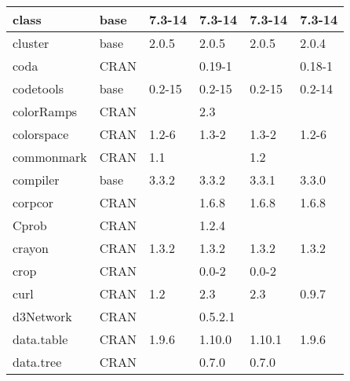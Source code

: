 \begin{longtable}{@{\extracolsep{\fill}}|l|l|l|l|l|l|@{}}
class                         & base                      & 7.3-14      & 7.3-14      & 7.3-14         & 7.3-14           \\ \hline
cluster                       & base                      & 2.0.5       & 2.0.5       & 2.0.5          & 2.0.4            \\ \hline
coda                          & CRAN                      &             & 0.19-1      &                & 0.18-1           \\ \hline
codetools                     & base                      & 0.2-15      & 0.2-15      & 0.2-15         & 0.2-14           \\ \hline
colorRamps                    & CRAN                      &             & 2.3         &                &                  \\ \hline
colorspace                    & CRAN                      & 1.2-6       & 1.3-2       & 1.3-2          & 1.2-6            \\ \hline
commonmark                    & CRAN                      & 1.1         &             & 1.2            &                  \\ \hline
compiler                      & base                      & 3.3.2       & 3.3.2       & 3.3.1          & 3.3.0            \\ \hline
corpcor                       & CRAN                      &             & 1.6.8       & 1.6.8          & 1.6.8            \\ \hline
Cprob                         & CRAN                      &             & 1.2.4       &                &                  \\ \hline
crayon                        & CRAN                      & 1.3.2       & 1.3.2       & 1.3.2          & 1.3.2            \\ \hline
crop                          & CRAN                      &             & 0.0-2       & 0.0-2          &                  \\ \hline
curl                          & CRAN                      & 1.2         & 2.3         & 2.3            & 0.9.7            \\ \hline
d3Network                     & CRAN                      &             & 0.5.2.1     &                &                  \\ \hline
data.table                    & CRAN                      & 1.9.6       & 1.10.0      & 1.10.1         & 1.9.6            \\ \hline
data.tree                     & CRAN                      &             & 0.7.0       & 0.7.0          &                  \\ \hline

\end{longtable}
